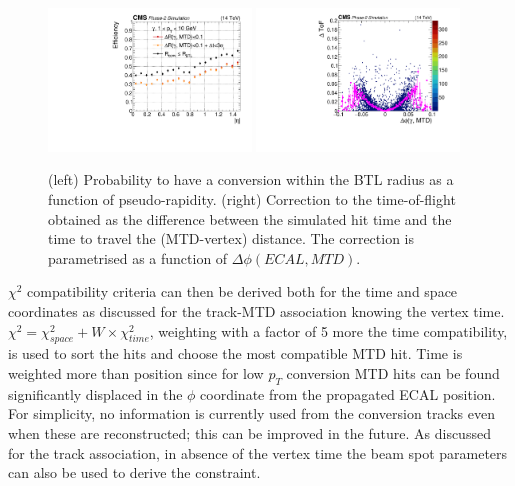 \begin{figure}[!hbtp]
\centering
\includegraphics[width=0.48\textwidth]{fig/performance/neutrals/neutrals_efficiency_vs_eta.pdf}
\includegraphics[width=0.48\textwidth]{fig/performance/neutrals/delta_tof_vs_dPhi.pdf}
\caption{(left) Probability to have a conversion within the BTL radius as a function of pseudo-rapidity. (right) Correction to the time-of-flight obtained as the difference between the simulated hit time and the time to travel the (MTD-vertex) distance. The correction is parametrised as a function of $\Delta\phi(ECAL,MTD)$.}
\label{fig:neutrals_mustache}
\end{figure}

$\chi^{2}$ compatibility criteria can then be derived both for the time and space coordinates as discussed for the track-MTD association knowing the vertex time.  $\chi^2=\chi^2_{space}+W\times\chi^2_{time}$, weighting with a factor of 5 more the time compatibility, is used to sort the hits and choose the most compatible MTD hit. Time is weighted more than position since for low $p_{T}$ conversion MTD hits can be found significantly displaced in the $\phi$ coordinate from the propagated ECAL position. For simplicity, no information is currently used from the conversion tracks even when these are reconstructed; this can be improved in the future. As discussed for the track association, in absence of the vertex time the beam spot parameters can also be used to derive the constraint.


